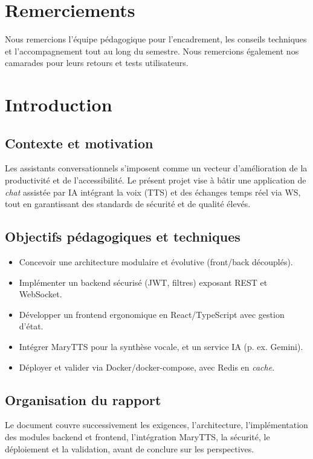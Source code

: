 \documentclass[12pt,a4paper]{report}
\begin{document}
\chapter*{Remerciements}
Nous remercions l'équipe pédagogique pour l'encadrement, les conseils techniques et l'accompagnement tout au long du semestre. Nous remercions également nos camarades pour leurs retours et tests utilisateurs.

\clearpage

\chapter{Introduction}
\section{Contexte et motivation}
Les assistants conversationnels s'imposent comme un vecteur d'amélioration de la productivité et de l'accessibilité. Le présent projet vise à bâtir une application de \emph{chat} assistée par \ac{IA} intégrant la voix (\ac{TTS}) et des échanges temps réel via \ac{WS}, tout en garantissant des standards de sécurité et de qualité élevés.

\section{Objectifs pédagogiques et techniques}
\begin{itemize}[leftmargin=*,nosep]
  \item Concevoir une architecture modulaire et évolutive (front/back découplés).
  \item Implémenter un backend sécurisé (JWT, filtres) exposant REST et WebSocket.
  \item Développer un frontend ergonomique en React/TypeScript avec gestion d'état.
  \item Intégrer MaryTTS pour la synthèse vocale, et un service IA (p. ex. Gemini).
  \item Déployer et valider via Docker/docker-compose, avec Redis en \emph{cache}.
\end{itemize}

\section{Organisation du rapport}
Le document couvre successivement les exigences, l'architecture, l'implémentation des modules backend et frontend, l'intégration MaryTTS, la sécurité, le déploiement et la validation, avant de conclure sur les perspectives.
\end{document}
